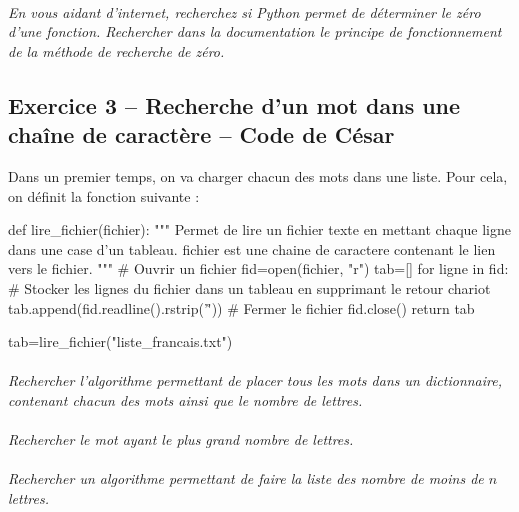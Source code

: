 \documentclass[11pt,oneside]{article}
\begin{document}
\paragraph{}
\textit{En vous aidant d'internet, recherchez si Python permet de déterminer le zéro d'une fonction. Rechercher dans la documentation le principe de fonctionnement de la méthode de recherche de zéro.}



\subsection*{Exercice 3 -- Recherche d'un mot dans une chaîne de caractère -- Code de César}
\setcounter{paragraph}{0}
Dans un premier temps, on va charger chacun des mots dans une liste. Pour cela, on définit la fonction suivante : 

\begin{py}
\begin{python}
def lire_fichier(fichier):
    """
    Permet de lire un fichier texte en mettant chaque ligne dans une case d'un tableau.
    fichier est une chaine de caractere contenant le lien vers le fichier.
    """
    # Ouvrir un fichier
    fid=open(fichier, "r")
    tab=[]
    for ligne in fid:
       # Stocker les lignes du fichier dans un tableau en supprimant le retour chariot
        tab.append(fid.readline().rstrip('\n\r'))
    # Fermer le fichier
    fid.close()
    return tab

tab=lire_fichier("liste_francais.txt")

\end{python}
\end{py}

\paragraph{}
\textit{Rechercher l'algorithme permettant de placer tous les mots dans un dictionnaire, contenant chacun des mots ainsi que le nombre de lettres.}

\paragraph{}
\textit{Rechercher le mot ayant le plus grand nombre de lettres.}

\paragraph{}
\textit{Rechercher un algorithme permettant de faire la liste des nombre de moins de $n$
 lettres.}
\end{document}
